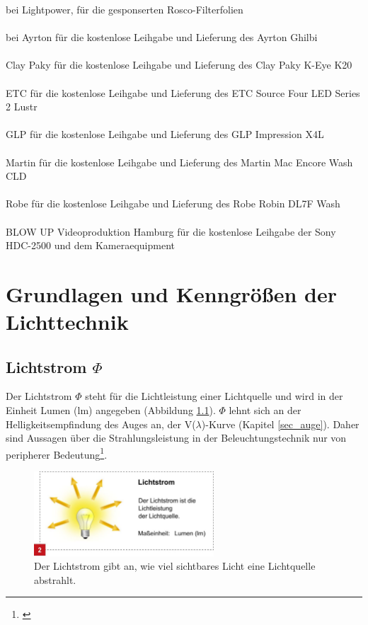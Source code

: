 \noindent bei Lightpower, für die gesponserten Rosco-Filterfolien\\\\
bei Ayrton für die kostenlose Leihgabe und Lieferung des  Ayrton Ghilbi\\\\
Clay Paky für die kostenlose Leihgabe und Lieferung des Clay Paky K-Eye K20\\\\
ETC für die kostenlose Leihgabe und Lieferung des ETC Source Four LED Series 2 Lustr\\\\
GLP für die kostenlose Leihgabe und Lieferung des GLP Impression X4L\\\\
Martin für die kostenlose Leihgabe und Lieferung des Martin Mac Encore Wash CLD\\\\
Robe für die kostenlose Leihgabe und Lieferung des Robe Robin DL7F Wash\\\\
BLOW UP Videoproduktion Hamburg für die kostenlose Leihgabe der Sony HDC-2500 und dem Kameraequipment

\newpage
\chapter{Grundlagen und Kenngrößen der Lichttechnik} \label{chap_grundlagen}

\section{Lichtstrom $\Phi$} \label{sec_lumen}
Der Lichtstrom $\Phi$ steht für die Lichtleistung einer Lichtquelle und wird in der Einheit Lumen (lm) angegeben (Abbildung \ref{b_lumen}). $\Phi$ lehnt sich an der Helligkeitsempfindung des Auges an, der V($\lambda$)-Kurve (Kapitel \ref{sec_auge}). Daher sind Aussagen über die Strahlungsleistung in der Beleuchtungstechnik nur von peripherer Bedeutung\footnote{\cite[23]{ris}}.

\begin{figure}[H]     %
\centering
\includegraphics[width=0.6\textwidth]{bilder/lumen} 
\caption {Der Lichtstrom gibt an, wie viel sichtbares Licht eine Lichtquelle abstrahlt\protect\footnotemark.}\label{b_lumen}
\end{figure}

